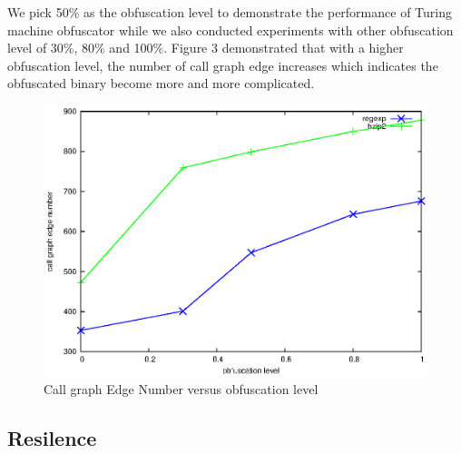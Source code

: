\documentclass[lnicst]{svmultln}
\begin{document}
We pick 50\% as the obfuscation level to demonstrate the performance of Turing machine obfuscator while we also conducted experiments with other obfuscation level of 30\%, 80\% and 100\%. Figure 3 demonstrated that with a higher obfuscation level,  the number of call graph edge increases which indicates the obfuscated binary become more and more complicated. 
\begin{figure}
  \includegraphics[width=0.9\linewidth]{cg.eps}
  \caption{Call graph Edge Number versus obfuscation level}
  \label{Figure 3}
\end{figure}

\subsection{Resilence}
\end{document}
